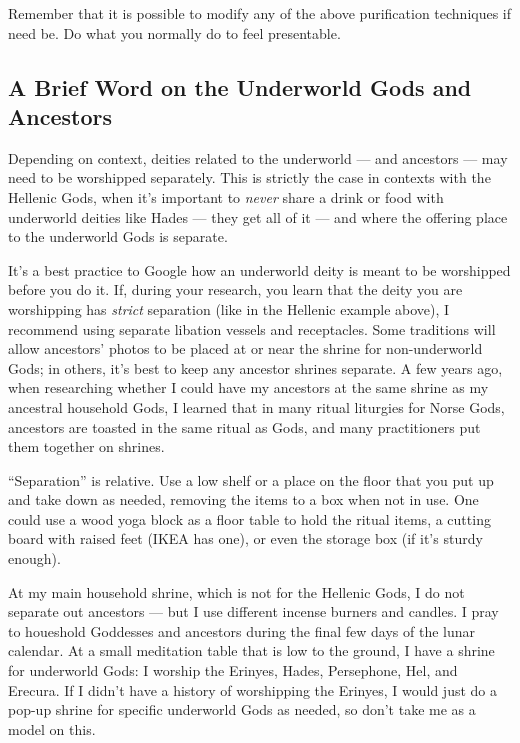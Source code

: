 \documentclass[
]{book}
\begin{document}
Remember that it is possible to modify any of the above purification techniques if need be. Do what you normally do to feel presentable.

\hypertarget{underworld}{%
\subsection{A Brief Word on the Underworld Gods and Ancestors}\label{underworld}}

Depending on context, deities related to the underworld --- and ancestors --- may need to be worshipped separately. This is strictly the case in contexts with the Hellenic Gods, when it's important to \emph{never} share a drink or food with underworld deities like Hades --- they get all of it --- and where the offering place to the underworld Gods is separate.

It's a best practice to Google how an underworld deity is meant to be worshipped before you do it. If, during your research, you learn that the deity you are worshipping has \emph{strict} separation (like in the Hellenic example above), I recommend using separate libation vessels and receptacles. Some traditions will allow ancestors' photos to be placed at or near the shrine for non-underworld Gods; in others, it's best to keep any ancestor shrines separate. A few years ago, when researching whether I could have my ancestors at the same shrine as my ancestral household Gods, I learned that in many ritual liturgies for Norse Gods, ancestors are toasted in the same ritual as Gods, and many practitioners put them together on shrines.

``Separation'' is relative. Use a low shelf or a place on the floor that you put up and take down as needed, removing the items to a box when not in use. One could use a wood yoga block as a floor table to hold the ritual items, a cutting board with raised feet (IKEA has one), or even the storage box (if it's sturdy enough).

At my main household shrine, which is not for the Hellenic Gods, I do not separate out ancestors --- but I use different incense burners and candles. I pray to houeshold Goddesses and ancestors during the final few days of the lunar calendar. At a small meditation table that is low to the ground, I have a shrine for underworld Gods: I worship the Erinyes, Hades, Persephone, Hel, and Erecura. If I didn't have a history of worshipping the Erinyes, I would just do a pop-up shrine for specific underworld Gods as needed, so don't take me as a model on this.
\end{document}
